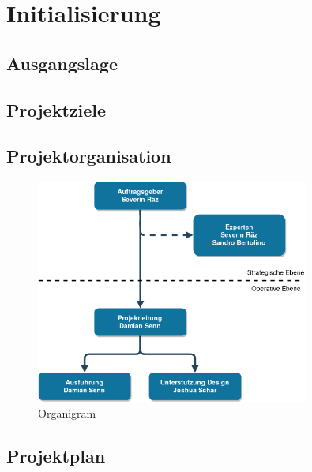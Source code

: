 \chapter{Initialisierung}

\label{ReportInitialisierung}

\section{Ausgangslage}

\section{Projektziele}



\clearpage

\section{Projektorganisation}

\begin{figure}[!htb]
  \centering
  \includegraphics[width=0.8\textwidth]{figures/organigram.png}
  \caption{Organigram}
\end{figure}

\section{Projektplan}



